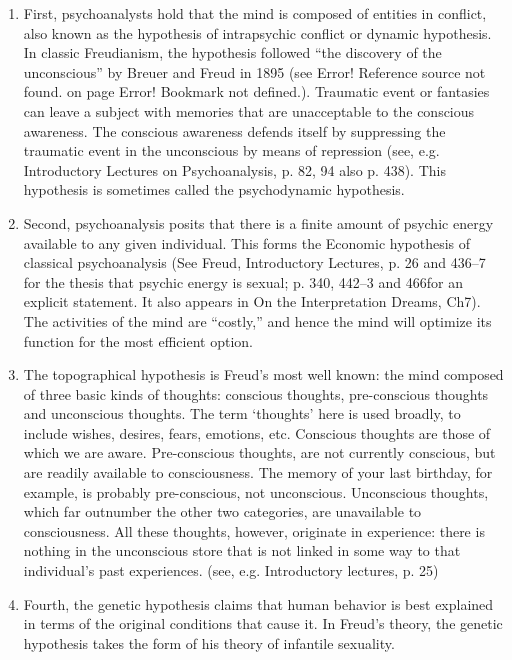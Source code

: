 \begin{enumerate}
\item First, psychoanalysts hold that the mind is composed of entities in conflict, also known as the hypothesis of intrapsychic conflict or dynamic hypothesis. In classic Freudianism, the hypothesis followed “the discovery of the unconscious” by Breuer and Freud in 1895 (see Error! Reference source not found. on page Error! Bookmark not defined.). Traumatic event or fantasies can leave a subject with memories that are unacceptable to the conscious awareness. The conscious awareness defends itself by suppressing the traumatic event in the unconscious by means of repression (see, e.g. Introductory Lectures on Psychoanalysis, p. 82, 94 also p. 438). This hypothesis is sometimes called the psychodynamic hypothesis.

\item Second, psychoanalysis posits that there is a finite amount of psychic energy available to any given individual. This forms the Economic hypothesis of classical psychoanalysis (See Freud, Introductory Lectures, p. 26 and 436--7 for the thesis that psychic energy is sexual; p. 340, 442--3 and 466for an explicit statement. It also appears in On the Interpretation Dreams, Ch7). The activities of the mind are “costly,” and hence the mind will optimize its function for the most efficient option.

\item The topographical hypothesis is Freud's most well known: the mind composed of three basic kinds of thoughts: conscious thoughts, pre-conscious thoughts and unconscious thoughts. The term `thoughts' here is used broadly, to include wishes, desires, fears, emotions, etc. Conscious thoughts are those of which we are aware. Pre-conscious thoughts, are not currently conscious, but are readily available to consciousness. The memory of your last birthday, for example, is probably pre-conscious, not unconscious. Unconscious thoughts, which far outnumber the other two categories, are unavailable to consciousness. All these thoughts, however, originate in experience: there is nothing in the unconscious store that is not linked in some way to that individual's past experiences. (see, e.g. Introductory lectures, p. 25)

\item Fourth, the genetic hypothesis claims that human behavior is best explained in terms of the original conditions that cause it. In Freud's theory, the genetic hypothesis takes the form of his theory of infantile sexuality.

\end{enumerate}

